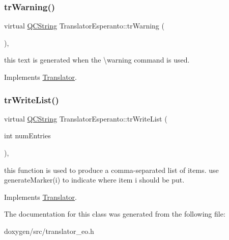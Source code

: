 \subsubsection{\texorpdfstring{trWarning()}{trWarning()}}
{\footnotesize\ttfamily virtual \mbox{\hyperlink{class_q_c_string}{Q\+C\+String}} Translator\+Esperanto\+::tr\+Warning (\begin{DoxyParamCaption}{ }\end{DoxyParamCaption})\hspace{0.3cm}{\ttfamily [inline]}, {\ttfamily [virtual]}}

this text is generated when the \textbackslash{}warning command is used. 

Implements \mbox{\hyperlink{class_translator}{Translator}}.

\mbox{\label{class_translator_esperanto_ab326ed2611d30516ca383721afb9c208}} 
\subsubsection{\texorpdfstring{trWriteList()}{trWriteList()}}
{\footnotesize\ttfamily virtual \mbox{\hyperlink{class_q_c_string}{Q\+C\+String}} Translator\+Esperanto\+::tr\+Write\+List (\begin{DoxyParamCaption}\item[{int}]{num\+Entries }\end{DoxyParamCaption})\hspace{0.3cm}{\ttfamily [inline]}, {\ttfamily [virtual]}}

this function is used to produce a comma-\/separated list of items. use generate\+Marker(i) to indicate where item i should be put. 

Implements \mbox{\hyperlink{class_translator}{Translator}}.



The documentation for this class was generated from the following file\+:\begin{DoxyCompactItemize}
\item 
doxygen/src/translator\+\_\+eo.\+h\end{DoxyCompactItemize}
